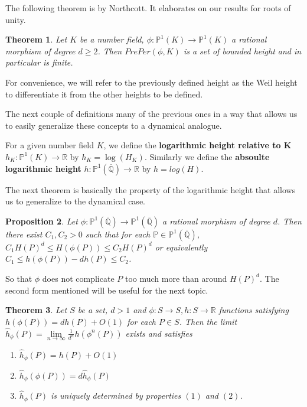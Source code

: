 \documentclass{amsart}
\newtheorem{thm}{Theorem}[section]
\newtheorem{prop}[thm]{Proposition}
\newcommand{\R}{\mathbb{R}}
\newcommand{\Q}{\mathbb{Q}}
\renewcommand{\P}{\mathbb{P}}
\begin{document}
The following theorem is by Northcott. It elaborates on our results for roots of unity.

\begin{thm}
Let $K$ be a number field, $\phi: \P^1(K) \rightarrow \P^1(K)$ a rational morphism of degree $d\geq 2$. Then $PrePer(\phi, K)$ is a set of bounded height and in particular is finite. 
\end{thm}

For convenience, we will refer to the previously defined height as the Weil height to differentiate it from the other heights to be defined.

The next couple of definitions many of the previous ones in a way that allows us to easily generalize these concepts to a dynamical analogue.

For a given number field $K$, we define the \textbf{logarithmic height relative to K} $h_K: \P^1(K) \rightarrow \R$ by $h_K = \log(H_K)$. Similarly we define the \textbf{absoulte logarithmic height} $h: \P^1(\overline{\Q}) \rightarrow \R$ by $h=log(H)$.

The next theorem is basically the property of the logarithmic height that allows us to generalize to the dynamical case. 

\begin{prop}

Let $\phi: \P^1(\overline{\Q}) \rightarrow \P^1(\overline{\Q})$ a rational morphism of degree $d$. Then there exist $C_1,C_2 > 0$ such that for each $\P \in \P^1(\overline{\Q})$, $C_1H(P)^d \leq H(\phi(P)) \leq C_2H(P)^d$ or equivalently $C_1 \leq h(\phi(P))-dh(P) \leq C_2$.   

\end{prop}

So that $\phi$ does not complicate $P$ too much more than around $H(P)^d$. The second form mentioned will be useful for the next topic.

\begin{thm}

Let $S$ be a set, $d>1$ and $\phi:S \rightarrow S, h:S \rightarrow \R$ functions satisfying $h(\phi(P)) = dh(P) + O(1)$ for each $P \in S$. Then the limit $\hat{h}_\phi(P) = \lim\limits_{n\rightarrow \infty} \frac{1}{d^n}h(\phi^n(P))$ exists and satisfies 

\begin{enumerate}

\item $\hat{h}_\phi(P) = h(P) + O(1)$
\item $\hat{h}_\phi(\phi(P)) = d\hat{h}_\phi(P)$
\item $\hat{h}_\phi(P)$ is uniquely determined by properties $(1)$ and $(2)$.

\end{enumerate} 

\end{thm}
\end{document}
